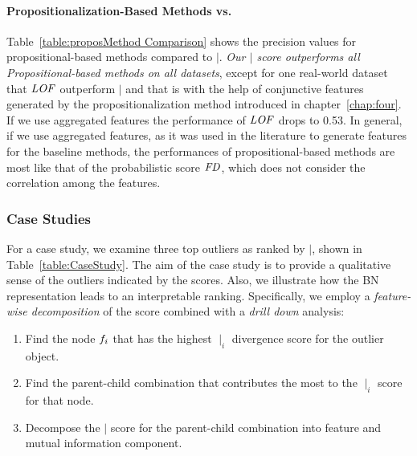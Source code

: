 																	\paragraph{Propositionalization-Based Methods vs. \mid} 
																	Table~\ref{table:proposMethod Comparison} shows the precision values for propositional-based methods compared to $\mid$. {\em Our $\mid$ score outperforms all Propositional-based methods on all datasets}, except for one real-world dataset that $\it{LOF}$ outperform $\mid$ and that is with the help of conjunctive features generated by the  propositionalization method introduced in chapter~\ref{chap:four}. If we use aggregated features the performance of $\it{LOF}$ drops to 0.53. In general, if we use aggregated features, as it was used in the literature to generate features for the baseline methods,
																	the performances of propositional-based methods are most like that of the probabilistic score $\it{FD}$, which does not consider the
																	correlation among the features. %
																		\subsubsection{Case Studies} For a case study, we examine three top outliers as ranked by $\mid$, shown in Table~\ref{table:CaseStudy}. 
																		The aim of the case study is to provide a qualitative sense of the outliers indicated by the scores. Also, we illustrate how the BN representation leads to an interpretable ranking. 
																		Specifically, we employ a {\em feature-wise decomposition} of the score combined with a {\em drill down} analysis: 
																		
																		\begin{enumerate}
																			\item Find the node $f_{i}$ that has the highest $\mid_{i}$ divergence score for the outlier object. 
																			\item Find the parent-child combination that contributes the most to the $\mid_{i}$ score for that node.
																			\item Decompose the $\mid$ score for the parent-child combination into feature and mutual information component. 
																		\end{enumerate}
																		

